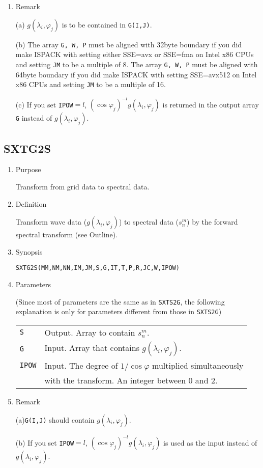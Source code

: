 \documentclass[a4paper]{scrartcl}
\begin{document}
\begin{enumerate}
\item Remark

(a) $g(\lambda_i,\varphi_j)$ is to be contained in \texttt{G(I,J)}.

(b) The array \texttt{G, W, P} must be aligned with 32byte boundary
if you did make ISPACK with setting either SSE=avx or SSE=fma
on Intel x86 CPUs and setting \texttt{JM} to be a multiple of 8.
The array \texttt{G, W, P} must be aligned with 64byte boundary
if you did make ISPACK with setting SSE=avx512
on Intel x86 CPUs and setting \texttt{JM} to be a multiple of 16.

(c) If you set \texttt{IPOW}$=l$, 
$(\cos\varphi_j)^{-l}g(\lambda_i,\varphi_j)$ is returned 
in the output array \texttt{G} instead of $g(\lambda_i,\varphi_j)$.

\end{enumerate}


\subsection{SXTG2S}

\begin{enumerate}

\item Purpose 

Transform from grid data to spectral data.

\item Definition

Transform wave data ($g(\lambda_i,\varphi_j)$)
to spectral data ($s^m_n$)
by the forward spectral transform (see Outline).

\item Synopsis 


\texttt{SXTG2S(MM,NM,NN,IM,JM,S,G,IT,T,P,R,JC,W,IPOW)}

\item Parameters

(Since most of parameters are the same as in \texttt{SXTS2G},
the following explanation is only for parameters
different from those in \texttt{SXTS2G})

\begin{tabular}{ll}
\texttt{S} & Output. Array to contain $s^m_n$.\\
\texttt{G} & Input. Array that 
contains $g(\lambda_i,\varphi_j)$.\\
\texttt{IPOW} & Input. 
The degree of $1/\cos\varphi$ multiplied 
simultaneously  \\
&  with the transform. An integer between 0 and 2.
\end{tabular}

\item Remark

(a)\texttt{G(I,J)} should contain $g(\lambda_i,\varphi_j)$.

(b) If you set \texttt{IPOW}$=l$, 
$(\cos\varphi_j)^{-l}g(\lambda_i,\varphi_j)$ is used as the input
instead of $g(\lambda_i,\varphi_j)$.
   
\end{enumerate}
\end{document}
